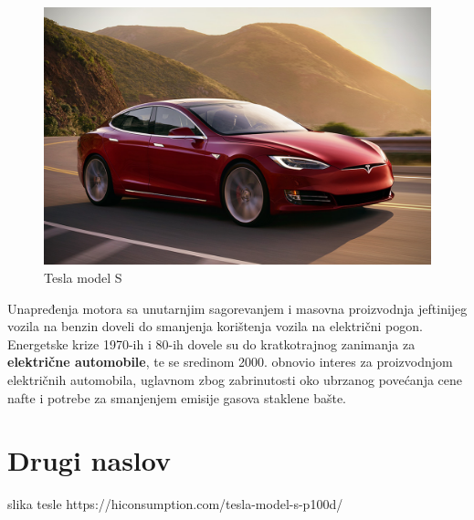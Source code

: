 \documentclass[a4paper]{article}
\begin{document}
\begin{figure}[h]
        \centering
        \includegraphics[width=\linewidth]{tesla.jpeg}
        \caption{Tesla model S}
        \label{fig:my_label}
        \end{figure}
        Unapređenja motora sa unutarnjim sagorevanjem i masovna proizvodnja jeftinijeg vozila na benzin doveli do smanjenja korištenja vozila na električni pogon.
         Energetske krize 1970-ih i 80-ih dovele su do kratkotrajnog zanimanja za \textbf{električne automobile}, te se sredinom 2000. obnovio interes za proizvodnjom električnih automobila, uglavnom zbog zabrinutosti oko ubrzanog povećanja cene nafte i potrebe za smanjenjem emisije gasova staklene bašte.
         
\label{sec:uvod}

\newpage
\section{Drugi naslov}


slika tesle https://hiconsumption.com/tesla-model-s-p100d/
\end{document}
